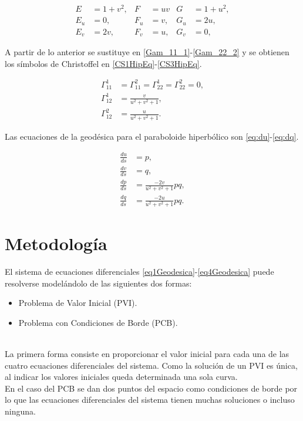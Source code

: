 \documentclass{endm}
\begin{document}
\begin{align}
E&=1+v^2,   & F &=uv    & G&=1+u^2, \label{fffHipEq} \\
E_u&=0,     & F_u&=v,   & G_u&=2u, \label{fffuHipEq}\\
E_v&=2v,    & F_v&=u,   & G_v&=0, \label{fffvHipEq}
\end{align}

A partir de lo anterior se sustituye en \ref{Gam_11_1}-\ref{Gam_22_2} y se obtienen los s\'imbolos de Christoffel en \ref{CS1HipEq}-\ref{CS3HipEq}.

\begin{align}
\Gamma_{11}^1&=\Gamma_{11}^2=\Gamma_{22}^1=\Gamma_{22}^2=0, \label{CS1HipEq} \\
\Gamma_{12}^1&=\frac{v}{u^2+v^2+1},  \label{CS2HipEq}   \\
\Gamma_{12}^2&=\frac{u}{u^2+v^2+1}.  \label{CS3HipEq}
\end{align}

Las ecuaciones de la geod\'esica para el paraboloide hiperb\'olico son \ref{eq:du}-\ref{eq:dq}.

\begin{align}
\frac{du}{ds}&=p,\label{eq:du} \\
\frac{dv}{ds}&=q,\label{eq:dv}     \\
\frac{dp}{ds}&=\frac{-2v}{u^2+v^2+1} pq, \label{eq:dp}\\ 
\frac{dq}{ds}&=\frac{-2u}{u^2+v^2+1} pq. \label{eq:dq}
\end{align}


%
\section{Metodolog\'ia}\label{Metodo}
El sistema de ecuaciones diferenciales \ref{eq1Geodesica}-\ref{eq4Geodesica} puede resolverse model\'andolo de las siguientes dos formas:
\begin{itemize}
    \item Problema de Valor Inicial (PVI).
    \item Problema con Condiciones de Borde (PCB).
\end{itemize}
\\
La primera forma consiste en proporcionar el valor inicial para cada una de las cuatro ecuaciones diferenciales del sistema.
Como la soluci\'on de un PVI es \'unica, al indicar los valores iniciales queda determinada una sola curva. \\
En el caso del PCB se dan dos puntos del espacio como condiciones de borde por lo que las ecuaciones diferenciales del sistema tienen muchas soluciones o incluso ninguna. \\
\end{document}
